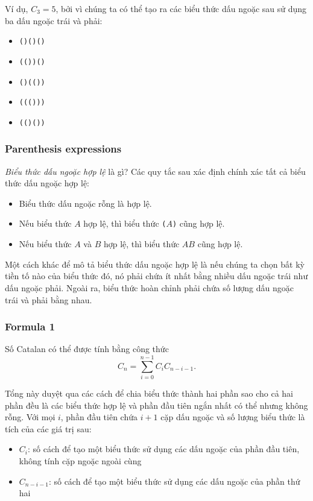 Ví dụ, $C_3=5$, bởi vì
chúng ta có thể tạo ra các biểu thức
dấu ngoặc sau sử dụng ba
dấu ngoặc trái và phải:

\begin{itemize}[noitemsep]
\item \texttt{()()()}
\item \texttt{(())()}
\item \texttt{()(())}
\item \texttt{((()))}
\item \texttt{(()())}
\end{itemize}

\subsubsection{Parenthesis expressions}


\emph{Biểu thức dấu ngoặc hợp lệ} là gì?
Các quy tắc sau xác định chính xác tất cả
biểu thức dấu ngoặc hợp lệ:

\begin{itemize}
\item Biểu thức dấu ngoặc rỗng là hợp lệ.
\item Nếu biểu thức $A$ hợp lệ,
thì biểu thức
\texttt{(}$A$\texttt{)} cũng hợp lệ.
\item Nếu biểu thức $A$ và $B$ hợp lệ,
thì biểu thức $AB$ cũng hợp lệ.
\end{itemize}

Một cách khác để mô tả biểu thức
dấu ngoặc hợp lệ là nếu
chúng ta chọn bất kỳ tiền tố nào của biểu thức đó,
nó phải chứa ít nhất bằng nhiều dấu ngoặc
trái như dấu ngoặc phải.
Ngoài ra, biểu thức hoàn chỉnh phải
chứa số lượng dấu ngoặc trái và phải bằng nhau.

\subsubsection{Formula 1}

Số Catalan có thể được tính bằng công thức
\[ C_n = \sum_{i=0}^{n-1} C_{i} C_{n-i-1}.\]

Tổng này duyệt qua các cách để chia
biểu thức thành hai phần
sao cho cả hai phần đều là các biểu thức
hợp lệ và phần đầu tiên ngắn nhất có thể
nhưng không rỗng.
Với mọi $i$, phần đầu tiên chứa $i+1$ cặp
dấu ngoặc và số lượng biểu thức
là tích của các giá trị sau:

\begin{itemize}
\item $C_{i}$: số cách để tạo một biểu thức
sử dụng các dấu ngoặc của phần đầu tiên,
không tính cặp ngoặc ngoài cùng
\item $C_{n-i-1}$: số cách để tạo một
biểu thức sử dụng các dấu ngoặc của phần thứ hai
\end{itemize}

